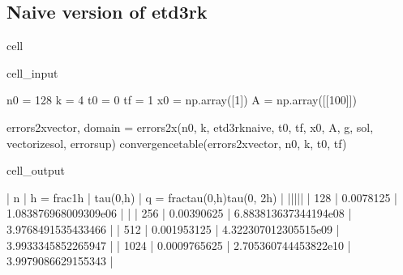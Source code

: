 \documentclass[letterpaper,10pt,english]{jupyterBook}
\begin{document}
\subsection{Naive version of etd3rk}
\label{\detokenize{appendix:naive-version-of-etd3rk}}
\begin{sphinxuseclass}{cell}\begin{sphinxVerbatimInput}

\begin{sphinxuseclass}{cell_input}
\begin{sphinxVerbatim}[commandchars=\\\{\}]
n0 = 128
k = 4
t0 = 0
tf = 1
x0 = np.array([1])
A = np.array([[100]])

errors\PYGZus{}2x\PYGZus{}vector, domain = errors\PYGZus{}2x(n0, k, etd3rk\PYGZus{}naive, t0, tf, x0, A, g, sol, vectorize\PYGZus{}sol, error\PYGZus{}sup)
convergence\PYGZus{}table(errors\PYGZus{}2x\PYGZus{}vector, n0, k, t0, tf)
\end{sphinxVerbatim}

\end{sphinxuseclass}\end{sphinxVerbatimInput}
\begin{sphinxVerbatimOutput}

\begin{sphinxuseclass}{cell_output}
\begin{sphinxVerbatim}[commandchars=\\\{\}]
| n | h = \PYGZdl{}\PYGZbs{}frac\PYGZob{}1\PYGZcb{}\PYGZob{}h\PYGZcb{}\PYGZdl{} | \PYGZdl{}\PYGZbs{}tau(0,h)\PYGZdl{} | q = \PYGZdl{}\PYGZbs{}frac\PYGZob{}tau(0,h)\PYGZcb{}\PYGZob{}tau(0, 2h)\PYGZcb{}\PYGZdl{} |
|\PYGZhy{}\PYGZhy{}\PYGZhy{}|\PYGZhy{}\PYGZhy{}\PYGZhy{}\PYGZhy{}\PYGZhy{}\PYGZhy{}\PYGZhy{}\PYGZhy{}\PYGZhy{}\PYGZhy{}\PYGZhy{}\PYGZhy{}\PYGZhy{}\PYGZhy{}\PYGZhy{}\PYGZhy{}\PYGZhy{}|\PYGZhy{}\PYGZhy{}\PYGZhy{}\PYGZhy{}\PYGZhy{}\PYGZhy{}\PYGZhy{}\PYGZhy{}\PYGZhy{}\PYGZhy{}\PYGZhy{}|\PYGZhy{}\PYGZhy{}\PYGZhy{}\PYGZhy{}\PYGZhy{}\PYGZhy{}\PYGZhy{}\PYGZhy{}\PYGZhy{}\PYGZhy{}\PYGZhy{}\PYGZhy{}\PYGZhy{}\PYGZhy{}\PYGZhy{}\PYGZhy{}\PYGZhy{}\PYGZhy{}\PYGZhy{}\PYGZhy{}\PYGZhy{}\PYGZhy{}\PYGZhy{}\PYGZhy{}\PYGZhy{}\PYGZhy{}\PYGZhy{}\PYGZhy{}\PYGZhy{}\PYGZhy{}\PYGZhy{}\PYGZhy{}\PYGZhy{}|
 | 128 | 0.0078125 | 1.083876968009309e\PYGZhy{}06 | \PYGZhy{} | 
 | 256 | 0.00390625 | 6.883813637344194e\PYGZhy{}08 | 3.9768491535433466 | 
 | 512 | 0.001953125 | 4.322307012305515e\PYGZhy{}09 | 3.9933345852265947 | 
 | 1024 | 0.0009765625 | 2.705360744453822e\PYGZhy{}10 | 3.9979086629155343 | 
\end{sphinxVerbatim}

\end{sphinxuseclass}\end{sphinxVerbatimOutput}

\end{sphinxuseclass}
\end{document}
